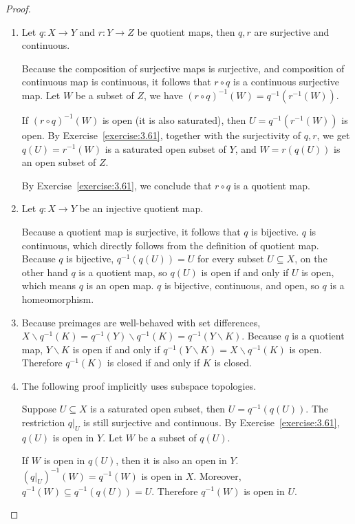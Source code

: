 \begin{proof}
    \begin{enumerate}[label={(\alph*)}]
        \item Let $q: X\to Y$ and $r: Y\to Z$ be quotient maps, then $q, r$ are surjective and continuous.

              Because the composition of surjective maps is surjective, and composition of continuous map is continuous, it follows that $r\circ q$ is a continuous surjective map. Let $W$ be a subset of $Z$, we have ${(r\circ q)}^{-1}(W) = q^{-1}(r^{-1}(W))$.

              If ${(r\circ q)}^{-1}(W)$ is open (it is also saturated), then $U = q^{-1}(r^{-1}(W))$ is open. By Exercise~\ref{exercise:3.61}, together with the surjectivity of $q, r$, we get $q(U) = r^{-1}(W)$ is a saturated open subset of $Y$, and $W = r(q(U))$ is an open subset of $Z$.

              By Exercise~\ref{exercise:3.61}, we conclude that $r\circ q$ is a quotient map.
        \item Let $q: X\to Y$ be an injective quotient map.

              Because a quotient map is surjective, it follows that $q$ is bijective. $q$ is continuous, which directly follows from the definition of quotient map. Because $q$ is bijective, $q^{-1}(q(U)) = U$ for every subset $U\subseteq X$, on the other hand $q$ is a quotient map, so $q(U)$ is open if and only if $U$ is open, which means $q$ is an open map. $q$ is bijective, continuous, and open, so $q$ is a homeomorphism.
        \item Because preimages are well-behaved with set differences, $X\smallsetminus q^{-1}(K) = q^{-1}(Y)\smallsetminus q^{-1}(K) = q^{-1}(Y\smallsetminus K)$. Because $q$ is a quotient map, $Y\smallsetminus K$ is open if and only if $q^{-1}(Y\smallsetminus K) = X\smallsetminus q^{-1}(K)$ is open. Therefore $q^{-1}(K)$ is closed if and only if $K$ is closed.
        \item The following proof implicitly uses subspace topologies.

              Suppose $U\subseteq X$ is a saturated open subset, then $U = q^{-1}(q(U))$. The restriction $q\vert_{U}$ is still surjective and continuous. By Exercise~\ref{exercise:3.61}, $q(U)$ is open in $Y$. Let $W$ be a subset of $q(U)$.

              If $W$ is open in $q(U)$, then it is also an open in $Y$. ${(q\vert_{U})}^{-1}(W) = q^{-1}(W)$ is open in $X$. Moreover, $q^{-1}(W)\subseteq q^{-1}(q(U)) = U$. Therefore $q^{-1}(W)$ is open in $U$.


\end{enumerate}
\end{proof}
